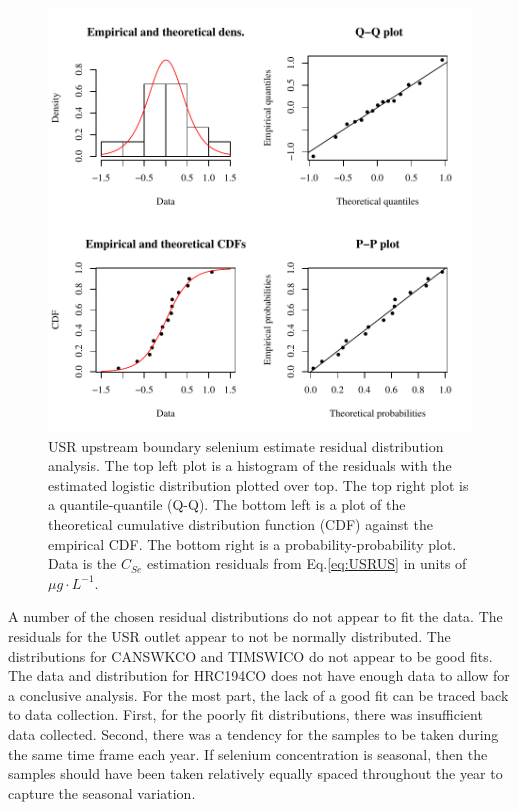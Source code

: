 \begin{linenumbers}
\begin{figure}[htbp]
	\begin{center}
		\includegraphics[width=6in]{"Figures/Results_USR/Conc Model res-fit U163"}
		\caption[USR upstream boundary selenium estimate residual distribution analysis.]{USR upstream boundary selenium estimate residual distribution analysis.  The top left plot is a histogram of the residuals with the estimated logistic distribution plotted over top.  The top right plot is a quantile-quantile (Q-Q).  The bottom left is a plot of the theoretical cumulative distribution function (CDF) against the empirical CDF.  The bottom right is a probability-probability plot.  Data is the $C_{Se}$ estimation residuals from Eq.\ref{eq:USRUS} in units of $\mu g \cdot L^{-1}$.}
	\label{fig:ExampleRes-Fit}
	\end{center}
\end{figure}

A number of the chosen residual distributions do not appear to fit the data.  The residuals for the USR outlet appear to not be normally distributed.  The distributions for CANSWKCO and TIMSWICO do not appear to be good fits.  The data and distribution for HRC194CO does not have enough data to allow for a conclusive analysis.  For the most part, the lack of a good fit can be traced back to data collection.  First, for the poorly fit distributions, there was insufficient data collected.  Second, there was a tendency for the samples to be taken during the same time frame each year.  If selenium concentration is seasonal, then the samples should have been taken relatively equally spaced throughout the year to capture the seasonal variation.


\end{linenumbers}
